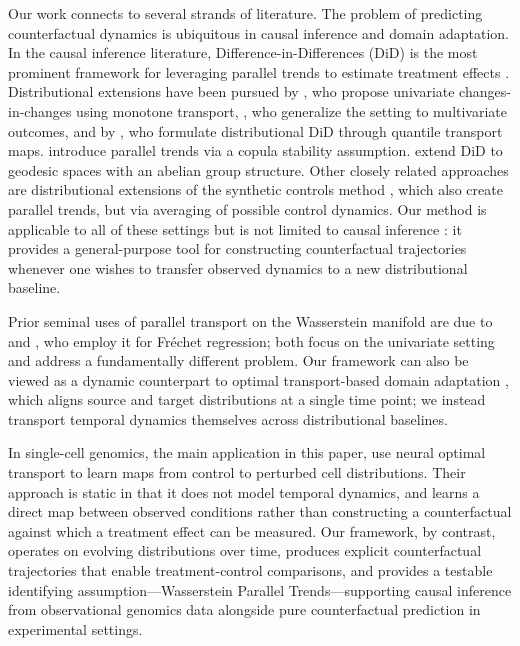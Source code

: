 \documentclass[11pt]{article}
\begin{document}
Our work connects to several strands of literature. The problem of predicting counterfactual dynamics is ubiquitous in causal inference and domain adaptation. In the causal inference literature, Difference-in-Differences (DiD) is the most prominent framework for leveraging parallel trends to estimate treatment effects \citep{ashenfelter1985using, card1994minimum, abadie2005semiparametric, roth2023s}. Distributional extensions have been pursued by \citet{athey2006identification}, who propose univariate changes-in-changes using monotone transport, \citet{torous2024optimal}, who generalize the setting to multivariate outcomes, and by \citet{sofer2016}, who formulate distributional DiD through quantile transport maps. \citet{callaway2019quantile} introduce parallel trends via a copula stability assumption. \citet{zhou2025geodesic} extend DiD to geodesic spaces with an abelian group structure. Other closely related approaches are distributional extensions of the synthetic controls method \citep{abadie2010synthetic, gunsilius2023distributional, gunsilius2024tangential}, which also create parallel trends, but via averaging of possible control dynamics. Our method is applicable to all of these settings but is not limited to causal inference \citep{gunsilius2025primer}: it provides a general-purpose tool for constructing counterfactual trajectories whenever one wishes to transfer observed dynamics to a new distributional baseline.

Prior seminal uses of parallel transport on the Wasserstein manifold are due to \citet{petersen2019wasserstein} and \citet{chen2023wasserstein}, who employ it for Fr\'{e}chet regression; both focus on the univariate setting and address a fundamentally different problem. Our framework can also be viewed as a dynamic counterpart to optimal transport-based domain adaptation \citep{courty2016optimal}, which aligns source and target distributions at a single time point; we instead transport temporal dynamics themselves across distributional baselines.

In single-cell genomics, the main application in this paper,  \citet{bunne2023learning} use neural optimal transport to learn maps from control to perturbed cell distributions. Their approach is static in that it does not model temporal dynamics, and learns a direct map between observed conditions rather than constructing a counterfactual against which a treatment effect can be measured. Our framework, by contrast, operates on evolving distributions over time, produces explicit counterfactual trajectories that enable treatment-control comparisons, and provides a testable identifying assumption---Wasserstein Parallel Trends---supporting causal inference from observational genomics data alongside pure counterfactual prediction in experimental settings.
\end{document}
